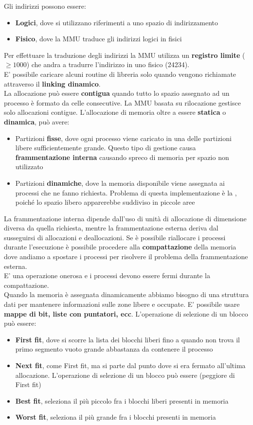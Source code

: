 \documentclass{article}
\begin{document}
Gli indirizzi possono essere:
\begin{itemize}
  \item \textbf{Logici}, dove si utilizzano riferimenti a uno spazio di indirizzamento
  \item \textbf{Fisico}, dove la MMU traduce gli indirizzi logici in fisici
\end{itemize}
Per effettuare la traduzione degli indirizzi la MMU utilizza un \textbf{registro limite} ($\geq 1000$) che andra a tradurre l'indirizzo in uno fisico (24234).\\
E' possibile caricare alcuni routine di libreria solo quando vengono richiamate attraverso il \textbf{linking dinamico}.\\
La allocazione può essere \textbf{contigua} quando tutto lo spazio assegnato ad un processo è formato da celle consecutive. La MMU basata su rilocazione gestisce solo allocazioni contigue.
L'allocazione di memoria oltre a essere \textbf{statica} o \textbf{dinamica}, può avere:
\begin{itemize}
  \item Partizioni \textbf{fisse}, dove ogni processo viene caricato in una delle partizioni libere sufficientemente grande. Questo tipo di gestione causa \textbf{frammentazione interna} causando spreco di memoria per spazio non utilizzato 
  \item Partizioni \textbf{dinamiche}, dove la memoria disponibile viene assegnata ai processi che ne fanno richiesta. Problema di questa implementazione è la , poiché lo spazio libero apparerebbe suddiviso in piccole aree
\end{itemize}
La frammentazione interna dipende dall'uso di unità di allocazione di dimensione diversa da quella richiesta, mentre la frammentazione esterna deriva dal susseguirsi di allocazioni e deallocazioni. Se è possibile riallocare i processi durante l'esecuzione è possibile procedere alla \textbf{compattazione} della memoria dove andiamo a spostare i processi per risolvere il problema della frammentazione esterna.\\
E' una operazione onerosa e i processi devono essere fermi durante la compattazione.\\
Quando la memoria è assegnata dinamicamente abbiamo bisogno di una struttura dati per mantenere informazioni sulle zone libere e occupate. E' possibile usare \textbf{mappe di bit, liste con puntatori, ecc}. L'operazione di selezione di un blocco può essere:
\begin{itemize}
  \item \textbf{First fit}, dove si scorre la lista dei blocchi liberi fino a quando non trova il primo segmento vuoto grande abbastanza da contenere il processo
  \item \textbf{Next fit}, come First fit, ma si parte dal punto dove si era fermato all'ultima allocazione. L'operazione di selezione di un blocco può essere (peggiore di First fit)
  \item \textbf{Best fit}, seleziona il più piccolo fra i blocchi liberi presenti in memoria
  \item \textbf{Worst fit}, seleziona il più grande fra i blocchi presenti in memoria
\end{itemize}
\end{document}

